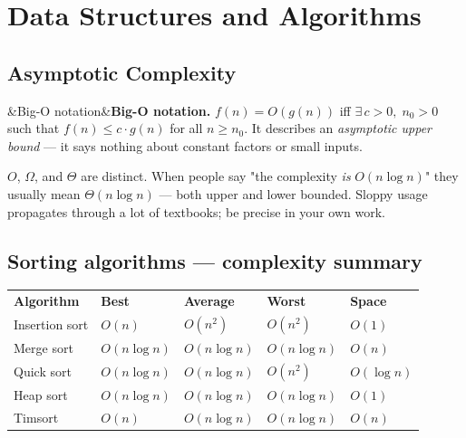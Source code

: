 \documentclass[12pt,a4paper]{article}
\newenvironment{Note}[1][Note]{%
  \begin{tcolorbox}[notebox, title=#1]}{\end{tcolorbox}}
\newenvironment{Def}[1][]{%
  \begin{tcolorbox}[defbox]\ifx&#1&\else\textbf{#1.}\enspace\fi}{\end{tcolorbox}}
\begin{document}
\section{Data Structures and Algorithms}

\subsection{Asymptotic Complexity}

\begin{Def}[Big-O notation]
  $f(n) = O(g(n))$ iff $\exists\, c > 0,\; n_0 > 0$ such that
  $f(n) \leq c \cdot g(n)$ for all $n \geq n_0$.
  It describes an \emph{asymptotic upper bound} — it says nothing about constant factors
  or small inputs.
\end{Def}

\begin{Note}
  $O$, $\Omega$, and $\Theta$ are distinct. When people say "the complexity \emph{is}
  $O(n \log n)$" they usually mean $\Theta(n \log n)$ — both upper and lower bounded.
  Sloppy usage propagates through a lot of textbooks; be precise in your own work.
\end{Note}

\subsection{Sorting algorithms — complexity summary}

\begin{center}
\begin{tabularx}{\linewidth}{L{2.8cm} C{2cm} C{2cm} C{2cm} C{1.6cm}}
  \color{white}\textbf{Algorithm} &
  \color{white}\textbf{Best} &
  \color{white}\textbf{Average} &
  \color{white}\textbf{Worst} &
  \color{white}\textbf{Space} \\
  Insertion sort & $O(n)$ & $O(n^2)$ & $O(n^2)$ & $O(1)$ \\
  Merge sort   & $O(n \log n)$ & $O(n \log n)$ & $O(n \log n)$ & $O(n)$ \\
  Quick sort   & $O(n \log n)$ & $O(n \log n)$ & $O(n^2)$ & $O(\log n)$ \\
  Heap sort    & $O(n \log n)$ & $O(n \log n)$ & $O(n \log n)$ & $O(1)$ \\
  Timsort      & $O(n)$ & $O(n \log n)$ & $O(n \log n)$ & $O(n)$ \\
\end{tabularx}
\end{center}
\end{document}
